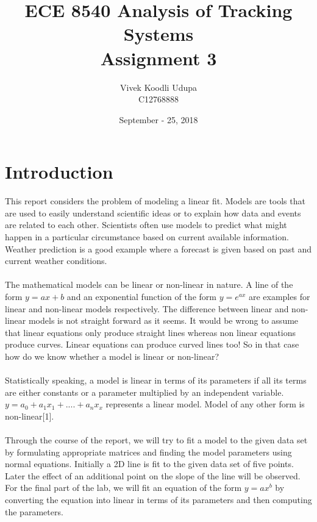 \documentclass[12pt]{article}
\title{ECE 8540 Analysis of Tracking Systems \\ 
	Assignment 3}
\author{Vivek Koodli Udupa \\ C12768888}
\date{September - 25, 2018 }
\begin{document}
\begin{titlepage}
\maketitle
{}%
\end{titlepage}

\section{Introduction}
This report considers the problem of modeling a linear fit. Models are tools that are used to easily understand scientific ideas or to explain how data and events are related to each other. Scientists often use models to predict what might happen in a particular circumstance based on current available information. Weather prediction is a good example where a forecast is given based on past and current weather conditions. \\
\\
The mathematical models can be linear or non-linear in nature. A line of the form $y = ax + b$ and an exponential function of the form $y = e^{ax}$ are examples for linear and non-linear models respectively. The difference between linear and non-linear models is not straight forward as it seems. It would be wrong to assume that linear equations only produce straight lines whereas non linear equations produce curves. Linear equations can produce curved lines too! So in that case how do we know whether a model is linear or non-linear?\\
\\
Statistically speaking, a model is linear in terms of its parameters if all its terms are either constants or a parameter multiplied by an independent variable. $y = a_0 + a_1 x_1 + .... + a_n x_x$ represents a linear model. Model of any other form is non-linear[1]. \\
\\
Through the course of the report, we will try to fit a model to the given data set by formulating appropriate matrices and finding the model parameters using normal equations. Initially a 2D line is fit to the given data set of five points. Later the effect of an additional point on the slope of the line will be observed. For the final part of the lab, we will fit an equation of the form $y = ax^b$ by converting the equation into linear in terms of its parameters and then computing the parameters.
 
\end{document}
